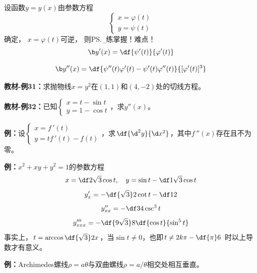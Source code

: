 设函数$y=y(x)$由参数方程
$$\left\{
\begin{array}{l}
x=\varphi(t)\\
y=\psi(t)
\end{array}
\right.$$
确定， $x=\varphi(t)$可逆， 则\ps{\b 熟练掌握！难点！}
$${\b y'(x)=\df{\psi'(t)}{\varphi'(t)}}$$

$${\b y''(x)=\df{\psi''(t)\varphi'(t)-\psi'(t)\varphi''(t)}{[\varphi'(t)]^3}}$$

{\bf 教材-例31：}求抛物线$x=y^2$在$(1,1)$和$(4,-2)$处的切线方程。

{\bf 教材-例32：}已知$\left\{\begin{array}{l}x=t-\sin t\\
y=1-\cos t\end{array}\right.$，求$y''(x)$。

\begin{center}
\end{center}

{\bf 例：}设$\left\{\begin{array}{l}x=f\,'(t)\\ y=tf\,'(t)-f(t)
\end{array}\right.$，求$\df{\d^2y}{\d x^2}$，其中$f\,''(x)$存在且不为零。

{\bf 例：}$x^2+xy+y^2=1$的参数方程
$$x=\df2{\sqrt3}\cos t,\quad y=\sin t-\df1{\sqrt3}\cos t$$
$$y'_x=-\df{\sqrt3}2\cot t-\df12$$
$$y''_{xx}=-\df34\csc^3t$$
$$y'''_{xxx}=-\df{9\sqrt3}8\df{\cos t}{\sin^5t}$$
事实上，$t=\arccos\df{\sqrt3}2x$，当$\sin t\ne0$，也即$t\ne2k\pi-\df{\pi}6$
时以上导数才有意义。

{\bf 例：}Archimedes螺线$\rho=a\theta$与双曲螺线$\rho=a/\theta$相交处相互垂直。

